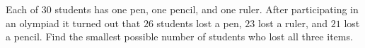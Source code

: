 Each of $30$ students has one pen, one pencil, and one ruler. After participating in an olympiad it turned out that $26$ students lost a pen, $23$ lost a ruler, and $21$ lost a pencil. Find the smallest possible number of students who lost all three items.
